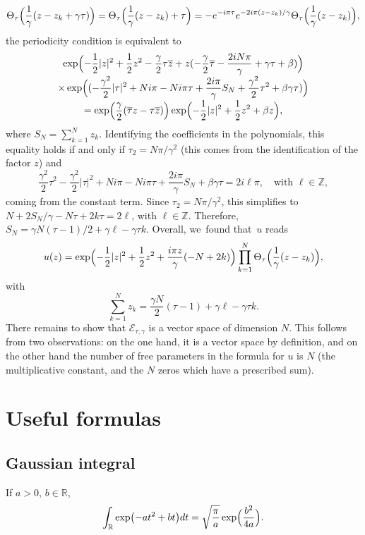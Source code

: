 \documentclass[10pt]{amsart}
\theoremstyle{definition}
\let\EE\exp
\let\ov\overline
\newcommand\R{\mathbb R}
\begin{document}
\[
\Theta_{\tau}\Bigl(\frac{1}{\gamma}(z-z_{k}+\gamma \tau)\Bigr) =\Theta_{\tau}\Bigl(\frac{1}{\gamma}(z-z_{k})+ \tau\Bigr) =- e^{-i \pi \tau}e^{- {2i\pi} (z-z_k)/ {\gamma}}\Theta_{\tau}\Bigl(\frac{1}{\gamma}(z-z_{k})\Bigr),
\]
the periodicity condition is equivalent to\vspace*{-5pt}
\begin{multline*}
\EE\Bigl(-\frac{1}{2}|z|^2 + \frac{1}{2}z^2 -\frac{\gamma}{2} \tau \ov{z} + z(-\frac{\gamma}{2} \ov{\tau} - \frac{2iN\pi}{\gamma} + \gamma\tau + \beta) \Bigr)\\[-3pt]
\times \EE\Bigl((-\frac{\gamma^2}{2} |\tau|^2 + Ni\pi - Ni\pi \tau + \frac{2i\pi}{\gamma} S_N + \frac{\gamma^2}{2} \tau^2 + \beta \gamma \tau)\Bigr)\\[-3pt]
= \EE\Bigl(\frac{\gamma}{2}(\ov{\tau} z - \tau \ov{z})\Bigr) \EE\Bigl(-\frac{1}{2} |z|^2 + \frac{1}{2} z^2 + \beta z\Bigr),
\end{multline*}
where $S_N=\sum_{k=1}^Nz_k$. Identifying the coefficients in the polynomials, this equality holds if and only if $\tau_2 = {N\pi}/{\gamma^2}$ (this comes from the identification of the factor $z$) and
\[
\frac{\gamma^2}{2} \tau^2 - \frac{\gamma^2}{2} |\tau|^2 + Ni\pi - Ni\pi\tau + \frac{2i\pi}{\gamma} S_N + \beta \gamma\tau = 2i \ell \pi, \quad \text{with $\ell \in \mathbb{Z}$},
\]
coming from the constant term. Since $\tau_2 = {N\pi}/{\gamma^2}$, this simplifies to $N + {2}S_N/{\gamma} - N\tau + 2k\tau = 2\ell$, with $\ell \in \mathbb{Z}$. Therefore, $S_N = {\gamma N}(\tau-1)/2+\gamma \ell-\gamma \tau k$. Overall, we~found that~$u$ reads
\[
u(z) = \EE\Bigl({-\frac{1}{2}|z|^2 + \frac{1}{2} z^2 + \frac{i\pi z}{\gamma}(-N + 2k)}\Bigr) \prod_{k=1}^N \Theta_{\tau}\Bigl(\frac{1}{\gamma}(z-z_{k})\Bigr),
\]
with
\[
\sum_{k=1}^N z_k = \frac{\gamma N}{2}(\tau-1)+\gamma \ell-\gamma \tau k. 
\]
There remains to show that $\mathcal{E}_{\tau,\gamma}$ is a vector space of dimension $N$. This follows from two observations: on the one hand, it is a vector space by definition, and on the other hand the number of free parameters in the formula for $u$ is $N$ (the multiplicative constant, and the $N$ zeros which have a prescribed sum).

\section{Useful formulas}

\subsection{Gaussian integral} If $a>0$, $b \in \mathbb{R}$,
\begin{equation}
\label{GaussianIntegral}
\int_{\R} \EE\bigl({-at^2+bt}\bigr) dt = \sqrt{\frac{\pi}{a}} \EE\Bigl(\frac{b^2}{4a}\Bigr).
\end{equation}
\end{document}
